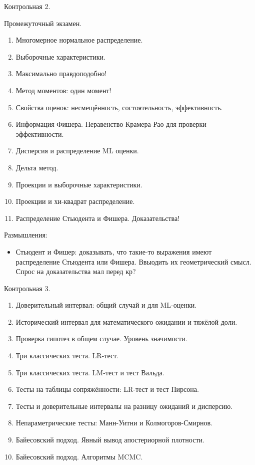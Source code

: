\documentclass[12pt]{article}
\begin{document}
Контрольная 2.

Промежуточный экзамен.

\begin{enumerate}[resume]
  \item Многомерное нормальное распределение.
  \item Выборочные характеристики.
  \item Максимально правдоподобно!
  \item Метод моментов: один момент!
  \item Свойства оценок: несмещённость, состоятельность, эффективность.
  \item Информация Фишера. Неравенство Крамера-Рао для проверки эффективности.
  \item Дисперсия и распределение ML оценки.
  \item Дельта метод.
  \item Проекции и выборочные характеристики.
  \item Проекции и хи-квадрат распределение.
  \item Распределение Стьюдента и Фишера. Доказательства!
\end{enumerate}

Размышления:
\begin{itemize}
  \item Стьюдент и Фишер: доказывать, что такие-то выражения имеют распределение Стьюдента или Фишера. Ввыодить их геометрический смысл.
  Спрос на доказательства мал перед кр?
\end{itemize}

Контрольная 3.

\begin{enumerate}[resume]
  \item Доверительный интервал: общий случай и для ML-оценки.
  \item Исторический интервал для математического ожидании и тяжёлой доли.
  \item Проверка гипотез в общем случае. Уровень значимости.
  \item Три классических теста. LR-тест.
  \item Три классических теста. LM-тест и тест Вальда.
  \item Тесты на таблицы сопряжённости: LR-тест и тест Пирсона.
  \item Тесты и доверительные интервалы на разницу ожиданий и дисперсию.
  \item Непараметрические тесты: Манн-Уитни и Колмогоров-Смирнов.
  \item Байесовский подход. Явный вывод апостериорной плотности.
  \item Байесовский подход. Алгоритмы MCMC.
\end{enumerate}
\end{document}
